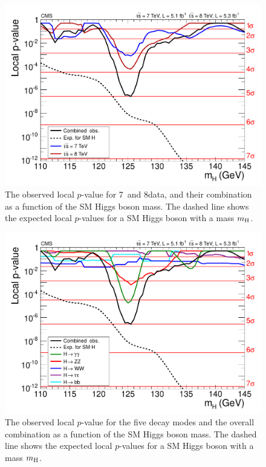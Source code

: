 \documentclass[11pt,twoside,a4paper,cmspaper,final]{cms-tdr}
\begin{document}
\begin{figure} [htbp]
\begin{center}
\includegraphics[width=\cmsFigWideWidth]{rect_pvala_all_energy_smallGGScale_wideX}
\caption{
The observed local $p$-value for 7\TeV~and 8\TeV data, and their combination
as a function of the SM Higgs boson mass. The dashed line shows the expected local $p$-values
for a SM Higgs boson with a mass $m_{\mathrm{H}}$.
    }
\label{fig:pvalue}
\end{center}
\end{figure}

\begin{figure} [htbp]
\begin{center}
\includegraphics[width=\cmsFigWideWidth]{rect_pvala_all_bydecay_smallGGScale_wideX}
\caption{
The observed local $p$-value for the five decay modes
and the overall combination as a function of the SM Higgs boson mass.
The dashed line shows the expected local $p$-values
for a SM Higgs boson with a mass $m_{\mathrm{H}}$.
}
\label{fig:pvalue_chans}
\end{center}
\end{figure}
\end{document}
